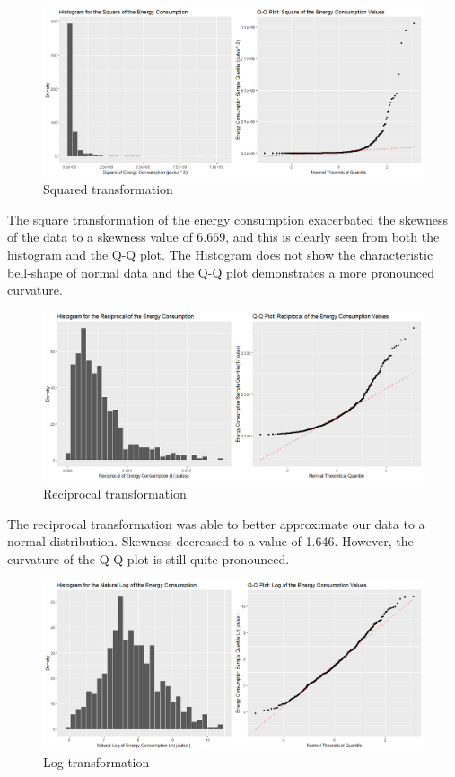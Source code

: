 \begin{figure}[H]
  \includegraphics[width=\linewidth]{./Images/Sqr_hist_qqplot.png}
  \caption{Squared transformation}
  \label{fig:histqq-sqr}
\end{figure}

The square transformation of the energy consumption exacerbated the skewness of the data to a skewness value of 6.669, and this is clearly seen from both the histogram and the Q-Q plot.  The Histogram does not show the characteristic bell-shape of normal data and the Q-Q plot demonstrates a more pronounced curvature.


\begin{figure}[H]
  \includegraphics[width=\linewidth]{./Images/Reciprocal_Hist_QQPlot.png}
  \caption{Reciprocal transformation}
  \label{fig:histqq-rec}
\end{figure}

The reciprocal transformation was able to better approximate our data to a normal distribution. Skewness decreased to a value of 1.646. However, the curvature of the Q-Q plot is still quite pronounced.

\begin{figure}[H]
  \includegraphics[width=\linewidth]{./Images/log_hist_qqplot.png}
  \caption{Log transformation}
  \label{fig:histqq-log}
\end{figure}

